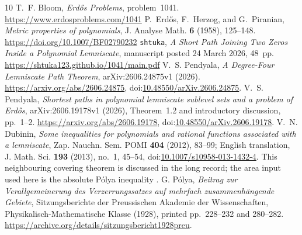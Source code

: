 \documentclass[11pt]{article}
\begin{document}
\begin{thebibliography}{10}
 T.~F. Bloom, \emph{Erd\H{o}s Problems}, problem~1041.
  \url{https://www.erdosproblems.com/1041}
 P.~Erd\H{o}s, F.~Herzog, and G.~Piranian,
  \emph{Metric properties of polynomials}, J. Analyse Math. \textbf{6}
  (1958), 125--148. \url{https://doi.org/10.1007/BF02790232}
 \texttt{shtuka},
  \emph{A Short Path Joining Two Zeros Inside a Polynomial Lemniscate},
  manuscript posted 24 March 2026, 48~pp.
  \url{https://shtuka123.github.io/1041/main.pdf}
 V.~S. Pendyala,
  \emph{A Degree-Four Lemniscate Path Theorem},
  arXiv:2606.24875v1 (2026).
  \url{https://arxiv.org/abs/2606.24875},
  doi:\href{https://doi.org/10.48550/arXiv.2606.24875}
  {10.48550/arXiv.2606.24875}.
 V.~S. Pendyala,
  \emph{Shortest paths in polynomial lemniscate sublevel sets and a problem
  of Erd\H{o}s}, arXiv:2606.19178v1 (2026),
  Theorem~1.2 and introductory discussion, pp.~1--2.
  \url{https://arxiv.org/abs/2606.19178},
  doi:\href{https://doi.org/10.48550/arXiv.2606.19178}
  {10.48550/arXiv.2606.19178}.
 V.~N. Dubinin, \emph{Some inequalities for polynomials and
  rational functions associated with a lemniscate}, Zap. Nauchn. Sem. POMI
  \textbf{404} (2012), 83--99; English translation, J. Math. Sci. \textbf{193}
  (2013), no.~1, 45--54,
  doi:\href{https://doi.org/10.1007/s10958-013-1432-4}{10.1007/s10958-013-1432-4}.
  This neighbouring covering theorem is discussed in the long record; the area input used here is the absolute P\'olya inequality \cite{polya1928}.
 G. P\'olya,
  \emph{Beitrag zur Verallgemeinerung des Verzerrungssatzes auf mehrfach
  zusammenh\"angende Gebiete}, Sitzungsberichte der Preussischen Akademie der
  Wissenschaften, Physikalisch-Mathematische Klasse (1928), printed
  pp.~228--232 and 280--282.
  \url{https://archive.org/details/sitzungsbericht1928preu}.
\end{thebibliography}
\end{document}
